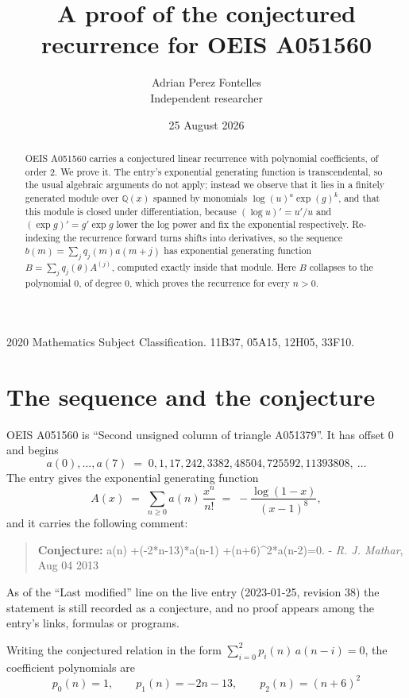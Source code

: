 \documentclass[11pt,a4paper]{article}
\title{A proof of the conjectured recurrence for OEIS A051560}
\author{Adrian Perez Fontelles\\ \small Independent researcher}
\date{25 August 2026}
\theoremstyle{plain}
\theoremstyle{definition}
\begin{document}
\maketitle

\begin{abstract}
OEIS A051560 carries a conjectured linear recurrence with polynomial coefficients, of
order 2. We prove it. The entry's exponential generating function is
transcendental, so the usual algebraic arguments do not apply; instead we observe that it
lies in a finitely generated module over $\mathbb{Q}(x)$ spanned by monomials
$\log(u)^{a}\exp(g)^{k}$, and that this module is closed under differentiation, because
$(\log u)'=u'/u$ and $(\exp g)'=g'\exp g$ lower the log power and fix the exponential
respectively. Re-indexing the recurrence forward turns shifts into derivatives, so the
sequence $b(m)=\sum_{j}q_{j}(m)a(m+j)$ has exponential generating function
$B=\sum_{j}q_{j}(\theta)A^{(j)}$, computed exactly inside that module. Here $B$ collapses
to the polynomial $0$, of degree $0$, which proves the recurrence for every
$n>0$.
\end{abstract}

\noindent\small 2020 Mathematics Subject Classification. 11B37, 05A15, 12H05, 33F10.\normalsize

\section{The sequence and the conjecture}

OEIS A051560 is ``Second unsigned column of triangle A051379''. It has offset $0$ and begins
\[
a(0),\dots,a(7)\;=\;0, 1, 17, 242, 3382, 48504, 725592, 11393808,\ \dots
\]
The entry gives the exponential generating function
\begin{equation}\label{eq:gf}
A(x)\;=\;\sum_{n\ge 0} a(n)\,\frac{x^{n}}{n!}\;=\;- \frac{\log{\left(1 - x \right)}}{\left(x - 1\right)^{8}} ,
\end{equation}
and it carries the following comment:
\begin{quote}\small
\textbf{Conjecture:} a(n) +(-2*n-13)*a(n-1) +(n+6)\textasciicircum{}2*a(n-2)=0. - \emph{R. J. Mathar}, Aug 04 2013
\end{quote}
As of the ``Last modified'' line on the live entry (2023-01-25, revision 38) the
statement is still recorded as a conjecture, and no proof appears among the entry's links,
formulas or programs.

Writing the conjectured relation in the form $\sum_{i=0}^{2}p_{i}(n)\,a(n-i)=0$,
the coefficient polynomials are
\[
p_{0}(n)=1,\qquad p_{1}(n)=- 2 n - 13,\qquad p_{2}(n)=\left(n + 6\right)^{2}
\]
\end{document}
